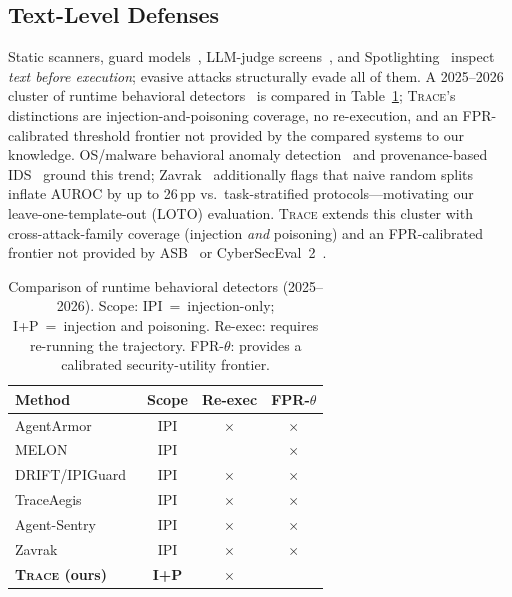 \documentclass[conference]{IEEEtran}
\begin{document}
\subsection{Text-Level Defenses}

Static scanners, guard models~\cite{inan2023llama}, LLM-judge
screens~\cite{yi2023benchmarking}, and Spotlighting~\cite{hines2024spotlighting}
inspect \emph{text before execution}; evasive attacks structurally
evade all of them.  A 2025--2026 cluster of runtime behavioral
detectors~\cite{liu2025traceaegis,sequeira2026agentsentry,
yu2026frauddetection,zavrak2026contentaware} is compared in
Table~\ref{tab:comparison}; \textsc{Trace}'s distinctions are
injection-and-poisoning coverage, no re-execution, and an
FPR-calibrated threshold frontier not provided by the compared
systems to our knowledge.
OS/malware behavioral anomaly detection~\cite{forrest1996sense,
sekar2001fast,rieck2011automatic,buczak2016survey} and provenance-based
IDS~\cite{zipperle2022pids,cheng2024kairos} ground this trend; Zavrak~\cite{zavrak2026contentaware} additionally flags
that naive random splits inflate AUROC by up to 26\,pp vs.\
task-stratified protocols---motivating our leave-one-template-out (LOTO) evaluation.
\textsc{Trace} extends this cluster with cross-attack-family coverage
(injection \emph{and} poisoning) and an FPR-calibrated frontier not
provided by ASB~\cite{zhang2024agentsecuritybench} or
CyberSecEval~2~\cite{bhatt2024cyberseceval2}.

\begin{table}[t]
\centering\small
\caption{Comparison of runtime behavioral detectors (2025--2026).
  Scope: IPI~=~injection-only; I+P~=~injection and poisoning.
  Re-exec: requires re-running the trajectory.
  FPR-$\theta$: provides a calibrated security-utility frontier.}
\label{tab:comparison}
\begin{tabular}{lccc}
\toprule
Method & Scope & Re-exec & FPR-$\theta$ \\
\midrule
AgentArmor~\cite{wang2025agentarmor}              & IPI & $\times$ & $\times$ \\
MELON~\cite{zhu2025melon}                         & IPI & \checkmark & $\times$ \\
DRIFT/IPIGuard~\cite{li2025drift,an2025ipiguard}  & IPI & $\times$ & $\times$ \\
TraceAegis~\cite{liu2025traceaegis}               & IPI & $\times$ & $\times$ \\
Agent-Sentry~\cite{sequeira2026agentsentry}        & IPI & $\times$ & $\times$ \\
Zavrak~\cite{zavrak2026contentaware}              & IPI & $\times$ & $\times$ \\
\textbf{\textsc{Trace} (ours)}                    & \textbf{I+P} & $\times$ & \checkmark \\
\bottomrule
\end{tabular}
\end{table}
\end{document}
